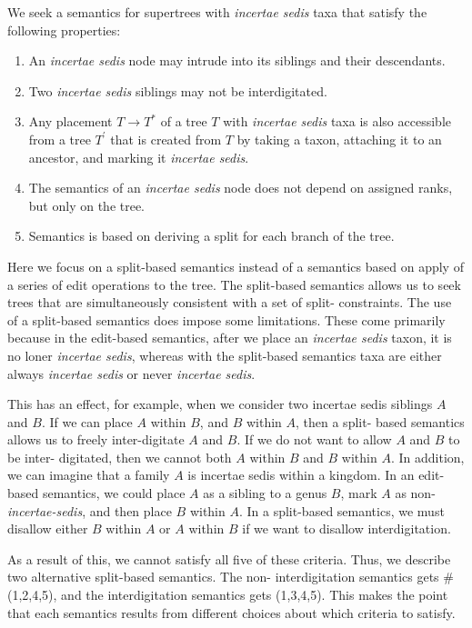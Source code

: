 \documentclass[english]{article}
\begin{document}
We seek a semantics for supertrees with \emph{incertae sedis }taxa
that satisfy the following properties:
\begin{enumerate}
    \item An
\emph{incertae sedis} node may intrude into its siblings and their
descendants.
\item Two \emph{incertae sedis} siblings may not be
interdigitated.
\item Any placement $T\to T^{*}$ of a tree $T$ with
\emph{incertae sedis} taxa is also accessible from a tree $T^{\prime}$
that is created from $T$ by taking a taxon, attaching it to an
ancestor, and marking it \emph{incertae sedis}.
 \item The semantics of an
\emph{incertae sedis} node does not depend on assigned ranks, but only
on the tree.
\item Semantics is based on deriving a split for each
branch of the tree.
\end{enumerate}
Here we focus on a split-based
semantics instead of a semantics based on apply of a series of edit
operations to the tree. The split-based semantics allows us to seek
trees that are simultaneously consistent with a set of split-
constraints. The use of a split-based semantics does impose some
limitations. These come primarily because in the edit-based semantics,
after we place an \emph{incertae sedis} taxon, it is no loner
\emph{incertae sedis}, whereas with the split-based semantics taxa are
either always \emph{incertae sedis} or never \emph{incertae sedis}.

This has an effect, for example, when we consider two incertae sedis
siblings $A$ and $B$. If we can place $A$ within $B$, and $B$ within
$A$, then a split- based semantics allows us to freely inter-digitate
$A$ and $B$. If we do not want to allow $A$ and $B$ to be inter-
digitated, then we cannot both $A$ within $B$ and $B$ within $A$. In
addition, we can imagine that a family $A$ is incertae sedis within a
kingdom. In an edit-based semantics, we could place $A$ as a sibling
to a genus $B$, mark $A$ as non-\emph{incertae-sedis}, and then place
$B$ within $A$. In a split-based semantics, we must disallow either
$B$ within $A$ or $A$ within $B$ if we want to disallow
interdigitation.

As a result of this, we cannot satisfy all five of these criteria.
Thus, we describe two alternative split-based semantics. The non-
interdigitation semantics gets \# (1,2,4,5), and the interdigitation
semantics gets (1,3,4,5). This makes the point that each semantics
results from different choices about which criteria to satisfy.
\end{document}
